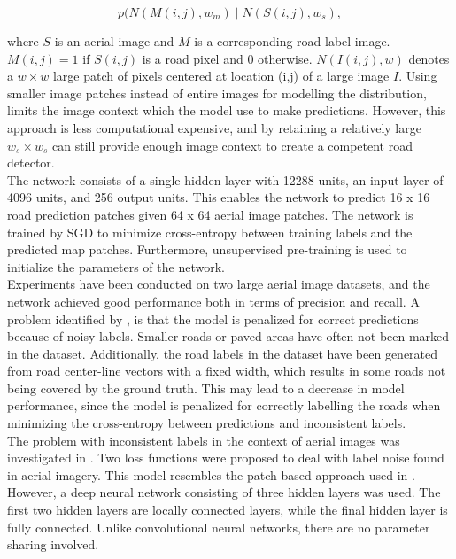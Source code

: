  $$p(N(M(i,j), w_m) \mid N(S(i,j), w_s),$$ 
 
\noindent where $S$ is an aerial image and $M$ is a corresponding road label image. $M(i,j) = 1$ if $S(i,j)$ is a road pixel and 0 otherwise.  $N(I(i,j), w)$  denotes a $w \times w$ large patch of pixels centered at location (i,j) of a large image $I$. Using smaller image patches instead of entire images for modelling the distribution, limits the image context which the model use to make predictions. However, this approach is less computational expensive, and by retaining a relatively large $w_s \times w_s$ can still provide enough image context to create a competent road detector. \\

The network consists of a single hidden layer with 12288 units, an input layer of 4096 units, and 256 output units. This enables the network to predict 16 x 16 road prediction patches given 64 x 64 aerial image patches. The network is trained by \ac{SGD} to minimize cross-entropy between training labels and the predicted map patches. Furthermore, unsupervised pre-training is used to initialize the parameters of the network.\\

Experiments have been conducted on two large aerial image datasets, and the network achieved good performance both in terms of precision and recall. A problem identified by \cite{Mnih_roads_high_res_aerial_images}, is that the model is penalized for correct predictions because of noisy labels. Smaller roads or paved areas have often not been marked in the dataset. Additionally, the road labels in the dataset have been generated from road center-line vectors with a fixed width, which results in some roads not being covered by the ground truth. This may lead to a decrease in model performance, since the model is penalized for correctly labelling the roads when minimizing the cross-entropy between predictions and inconsistent labels.\\

The problem with inconsistent labels in the context of aerial images was investigated in \citep{Mnih_aerial_images_noisy}. Two loss functions were proposed to deal with label noise found in aerial imagery. This model resembles the patch-based approach used in \cite{Mnih_roads_high_res_aerial_images}. However, a deep neural network consisting of three hidden layers was used. The first two hidden layers are locally connected layers, while the final hidden layer is fully connected. Unlike convolutional neural networks, there are no parameter sharing involved. \\

